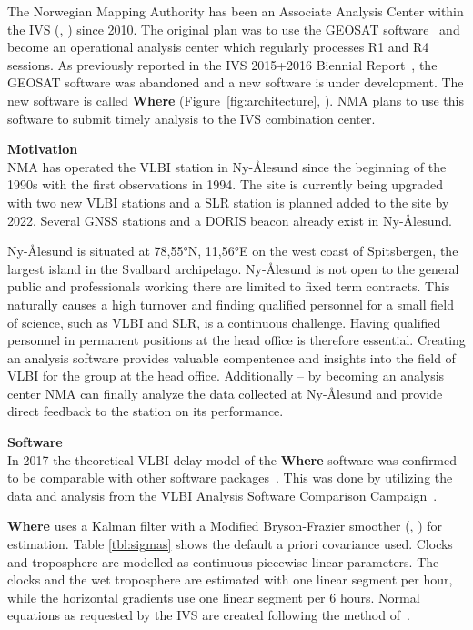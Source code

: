 The Norwegian Mapping Authority has been an Associate Analysis Center within the IVS
(\cite{behrend2013}, \cite{schuh2012}) since 2010.  The original plan was to use the GEOSAT software~\cite{kierulf2010}
and become an operational analysis center which regularly processes R1 and R4 sessions. As previously reported in the
IVS 2015+2016 Biennial Report~\cite{kirkvik2017a}, the GEOSAT software was abandoned and a new software is under
development. The new software is called \textbf{Where} (Figure~\ref{fig:architecture}, \cite{kirkvik2017b}).  NMA plans
to use this software to submit timely analysis to the IVS combination center.

{\large\bfseries Motivation}\\

NMA has operated the VLBI station in Ny-{\AA}lesund since the beginning of the 1990s with the first observations in
1994. The site is currently being upgraded with two new VLBI stations and a SLR station is planned added to the site by
2022.  Several GNSS stations and a DORIS beacon already exist in Ny-{\AA}lesund.

Ny-{\AA}lesund is situated at \ang{78,55}N, \ang{11,56}E on the west coast of Spitsbergen, the largest island in the
Svalbard archipelago. Ny-{\AA}lesund is not open to the general public and professionals working there are limited to
fixed term contracts. This naturally causes a high turnover and finding qualified personnel for a small field of
science, such as VLBI and SLR, is a continuous challenge. Having qualified personnel in permanent positions at the head
office is therefore essential. Creating an analysis software provides valuable compentence and insights into the field
of VLBI for the group at the head office. Additionally -- by becoming an analysis center NMA can finally analyze the
data collected at Ny-{\AA}lesund and provide direct feedback to the station on its performance.

{\large\bfseries Software}\\

In 2017 the theoretical VLBI delay model of the \textbf{Where} software was confirmed to be comparable with other
software packages~\cite{kirkvik2017b}.  This was done by utilizing the data and analysis from the VLBI Analysis
Software Comparison Campaign~\cite{klopotek2016}.

\textbf{Where} uses a Kalman filter with a Modified Bryson-Frazier smoother (\cite{bierman2006}, \cite{gibbs2011})
for estimation.  Table \ref{tbl:sigmas} shows the default a priori covariance used.  Clocks and troposphere are
modelled as continuous piecewise linear parameters. The clocks and the wet troposphere are estimated with one linear
segment per hour, while the horizontal gradients use one linear segment per 6 hours. Normal equations as requested by
the IVS are created following the method of~\cite{mysen2017}.

